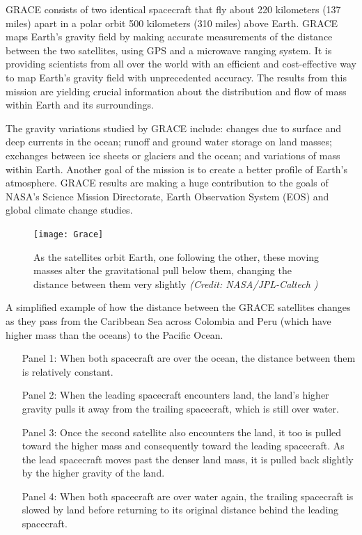 \documentclass[a4paper,12pt]{report}
\begin{document}
GRACE consists of two identical spacecraft that fly about 220 kilometers (137 miles) apart in a polar orbit 500 kilometers (310 miles) above Earth. GRACE maps Earth's gravity field by making accurate measurements of the distance between the two satellites, using GPS and a microwave ranging system. It is providing scientists from all over the world with an efficient and cost-effective way to map Earth's gravity field with unprecedented accuracy. The results from this mission are yielding crucial information about the distribution and flow of mass within Earth and its surroundings.

The gravity variations studied by GRACE include: changes due to surface and deep currents in the ocean; runoff and ground water storage on land masses; exchanges between ice sheets or glaciers and the ocean; and variations of mass within Earth. Another goal of the mission is to create a better profile of Earth's atmosphere. GRACE results are making a huge contribution to the goals of NASA's Science Mission Directorate, Earth Observation System (EOS) and global climate change studies.


\begin{figure}[!h]
\centering
\texttt{[image: Grace]}
\caption{As the satellites orbit Earth, one following the other, these moving masses alter the gravitational pull below them, changing the distance between them very slightly %
\textit{(Credit: NASA/JPL-Caltech )}%
}
\label{fig:GRACE}
\end{figure}

A simplified example of how the distance between the GRACE satellites changes as they pass from the Caribbean Sea across Colombia and Peru (which have higher mass than the oceans) to the Pacific Ocean.
\begin{itemize}

	\item[Panel 1:] When both spacecraft are over the ocean, the distance between them is relatively constant.

	\item[Panel 2:] When the leading spacecraft encounters land, the land's higher gravity pulls it away from the trailing spacecraft, which is still over water.

	\item[Panel 3:] Once the second satellite also encounters the land, it too is pulled toward the higher mass and consequently toward the leading spacecraft. As the lead spacecraft moves past the denser land mass, it is pulled back slightly by the higher gravity of the land.

	\item[Panel 4:] When both spacecraft are over water again, the trailing spacecraft is slowed by land before returning to its original distance behind the leading spacecraft.

\end{itemize}
\end{document}
